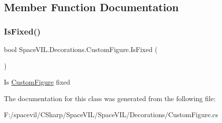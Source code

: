 \subsection{Member Function Documentation}
\mbox{\label{class_space_v_i_l_1_1_decorations_1_1_custom_figure_a4b2ff5319a7d0b34076da118107ee937}} 
\subsubsection{\texorpdfstring{Is\+Fixed()}{IsFixed()}}
{\footnotesize\ttfamily bool Space\+V\+I\+L.\+Decorations.\+Custom\+Figure.\+Is\+Fixed (\begin{DoxyParamCaption}{ }\end{DoxyParamCaption})}



Is \mbox{\hyperlink{class_space_v_i_l_1_1_decorations_1_1_custom_figure}{Custom\+Figure}} fixed 



The documentation for this class was generated from the following file\+:\begin{DoxyCompactItemize}
\item 
F\+:/spacevil/\+C\+Sharp/\+Space\+V\+I\+L/\+Space\+V\+I\+L/\+Decorations/Custom\+Figure.\+cs\end{DoxyCompactItemize}
